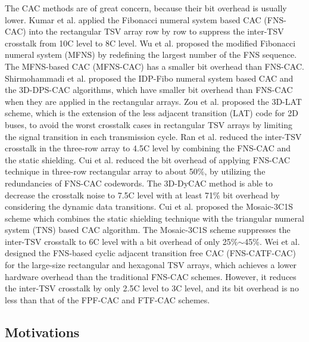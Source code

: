 \documentclass[lettersize,journal]{IEEEtran}
\begin{document}
The CAC methods are of great concern, because their bit overhead is usually lower. Kumar et al. \cite{A05_Kumar_6513784} applied the Fibonacci numeral system based CAC (FNS-CAC) into the rectangular TSV array row by row to suppress the inter-TSV crosstalk from 10C level to 8C level. Wu et al. \cite{A16_Wu_5395631} proposed the modified Fibonacci numeral system (MFNS) by redefining the largest number of the FNS sequence. The MFNS-based CAC (MFNS-CAC) has a smaller bit overhead than FNS-CAC. Shirmohammadi et al. \cite{A17_Shirmohammadi_6675266,A18_Shirmohammadi_7780349} proposed the IDP-Fibo numeral system based CAC and the 3D-DPS-CAC algorithms, which have smaller bit overhead than FNS-CAC when they are applied in the rectangular arrays. Zou et al. \cite{A19_Zou_6742982} proposed the 3D-LAT scheme, which is the extension of the less adjacent transition (LAT) code for 2D buses, to avoid the worst crosstalk cases in rectangular TSV arrays by limiting the signal transition in each transmission cycle. Ran et al. \cite{A20_Ran_7588317} reduced the inter-TSV crosstalk in the three-row array to 4.5C level by combining the FNS-CAC and the static shielding. Cui et al. \cite{A10_Cui_7851080} reduced the bit overhead of applying FNS-CAC technique in three-row rectangular array to about 50\%, by utilizing the redundancies of FNS-CAC codewords. The 3D-DyCAC method is able to decrease the crosstalk noise to 7.5C level with at least 71\% bit overhead by considering the dynamic data transitions. Cui et al. \cite{A11_Cui_9509749} proposed the Mosaic-3C1S scheme which combines the static shielding technique with the triangular numeral system (TNS) based CAC algorithm. The Mosaic-3C1S scheme suppresses the inter-TSV crosstalk to 6C level with a bit overhead of only 25\%$\sim$45\%. Wei et al. \cite{FNSCATF_10945736} designed the FNS-based cyclic adjacent transition free CAC (FNS-CATF-CAC) for the large-size rectangular and hexagonal TSV arrays, which achieves a lower hardware overhead than the traditional FNS-CAC schemes. However, it reduces the inter-TSV crosstalk by only 2.5C level to 3C level, and its bit overhead is no less than that of the FPF-CAC and FTF-CAC schemes.


\subsection{Motivations}\label{subsec-pre-motications}
\end{document}
